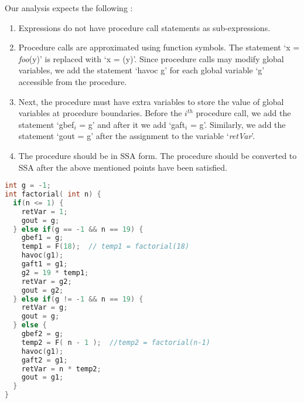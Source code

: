 \documentclass{llncs}
\newcommand{\foo}{\textit{foo}}
\newcommand{\retVar}{\textit{retVar}}
\newcommand{\F}{\mathit{F}}
\begin{document}
Our analysis expects the following :
\begin{enumerate}
\item Expressions do not have procedure call statements as
  sub-expressions. 
\item Procedure calls are approximated using function symbols. The
  statement `x = \foo(y)' is replaced with `x = \F(y)'. Since
  procedure calls may modify global variables, we add the statement
  `havoc g' for each global variable `g' accessible from the
  procedure.
  
\item Next, the procedure must have extra variables to store the value
  of global variables at procedure boundaries.
  Before the $\mathit{i^{th}}$
  procedure call, we add the statement `gbef$_i$ = g' and after it we
  add `gaft$_i$ = g'. Similarly, we add the statement `gout = g'
  after the assignment to the variable `\retVar'.
\item The procedure should be in SSA form. The procedure should be
  converted to SSA after the above mentioned points have been
  satisfied.
\end{enumerate}

\begin{lstlisting}[language=c, caption= {Procedure `factorial' from
      Listing~\ref{lst:factorialSimple} converted to the form our
      approach expects. We refer to this procedure as `transformed
      factorial'.}, label=lst:factorialTransformed]
int g = -1;
int factorial( int n) {
  if(n <= 1) {
    retVar = 1;
    gout = g;
  } else if(g == -1 && n == 19) {
    gbef1 = g;
    temp1 = F(18);  // temp1 = factorial(18)
    havoc(g1);
    gaft1 = g1;
    g2 = 19 * temp1;
    retVar = g2;
    gout = g2;
  } else if(g != -1 && n == 19) {
    retVar = g;
    gout = g;
  } else {
    gbef2 = g;
    temp2 = F( n - 1 );  //temp2 = factorial(n-1)
    havoc(g1);    
    gaft2 = g1;
    retVar = n * temp2;
    gout = g1;
  }
}
\end{lstlisting}
\end{document}
